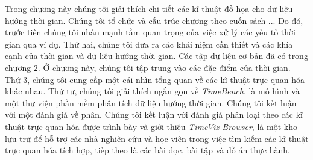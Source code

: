 Trong chương này chúng tôi giải thích chi tiết các kĩ thuật đồ họa cho dữ liệu hướng thời gian. Chúng tôi tổ chức và cấu trúc chương theo cuốn sách ... Do đó, trước tiên chúng tôi nhấn mạnh tầm quan trọng của việc xử lý các yếu tố thời gian qua ví dụ. Thứ hai, chúng tôi đưa ra các khái niệm cần thiết và các khía cạnh của thời gian và dữ liệu hướng thời gian. Các tập dữ liệu cơ bản đã có trong chương 2. Ở chương này, chúng tôi tập trung vào các đặc điểm của thời gian. Thứ 3, chúng tôi cung cấp một cái nhìn tổng quan về các kĩ thuật trực quan hóa khác nhau. Thứ tư, chúng tôi giải thích ngắn gọn về  \textit{TimeBench}, là mô hình và một thư viện phần mềm phân tích dữ liệu hướng thời gian. Chúng tôi kết luận với một đánh giá về phân. Chúng tôi kết luận với đánh giá phân loại theo các kĩ thuật trực quan hóa được trình bày và giới thiệu \textit{TimeViz Browser}, là một kho lưu trữ để hỗ trợ các nhà nghiên cứu và học viên trong việc tìm kiếm các kĩ thuật trực quan hóa tích hợp, tiếp theo là các bài đọc, bài tập và đồ án thực hành.